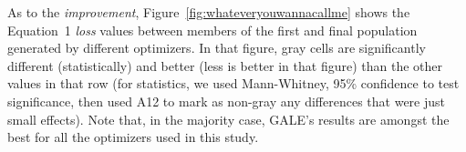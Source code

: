 \documentclass[10pt,journal,compsoc]{IEEEtran}
\newcommand{\fig}[1]{Figure~\ref{fig:#1}}
\newenvironment{changed}{\par\color{MyDarkBlue}}{\par}
\begin{document}
\begin{changed}
As to the {\em improvement}, 
 \fig{whateveryouwannacallme} shows the
Equation~1 {\em loss} values between members of the
first and final population generated by different
optimizers. In that figure,
 gray cells are significantly different
(statistically) and better (less is better in that figure)
than the other values in that row
(for statistics, we used Mann-Whitney, 95\%
confidence to test significance, then used A12 to
mark as non-gray any differences that were just
small effects). Note that, in the majority case, GALE's results
are amongst the best for all the optimizers used in this study.


\end{changed}



\begin{changed}


\end{changed}
\end{document}
